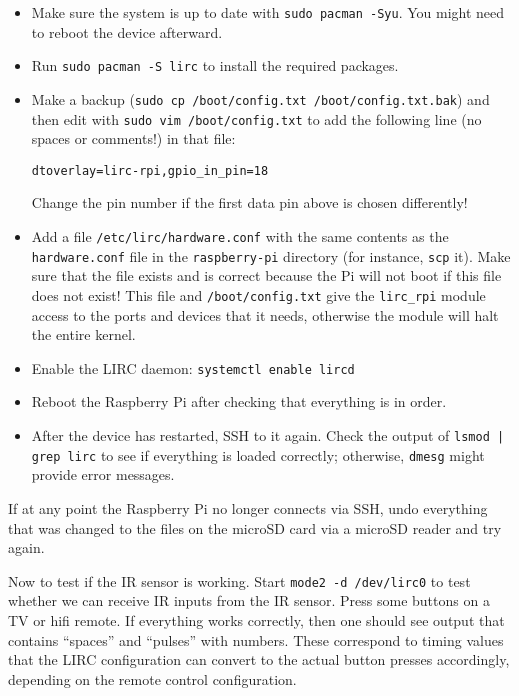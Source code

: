 \documentclass{article}
\begin{document}
\begin{itemize}
    \item Make sure the system is up to date with {\tt sudo pacman -Syu}. You
          might need to reboot the device afterward.
    \item Run {\tt sudo pacman -S lirc} to install the required packages.
    \item Make a backup ({\tt sudo cp /boot/config.txt /boot/config.txt.bak}) 
          and then edit with {\tt sudo vim /boot/config.txt} to add the 
          following line (no spaces or comments!) in that file:

          {\tt dtoverlay=lirc-rpi,gpio\_in\_pin=18}

          Change the pin number if the first data pin above is chosen 
          differently!
    \item Add a file {\tt /etc/lirc/hardware.conf} with the same contents as 
          the {\tt hardware.conf} file in the {\tt raspberry-pi} directory (for 
          instance, {\tt scp} it).  Make sure that the file exists and is 
          correct because the Pi will not boot if this file does not exist!  
          This file and {\tt /boot/config.txt} give the {\tt lirc\_rpi} module 
          access to the ports and devices that it needs, otherwise the module 
          will halt the entire kernel.
    \item Enable the LIRC daemon: {\tt systemctl enable lircd}
    \item Reboot the Raspberry Pi after checking that everything is in order.
    \item After the device has restarted, SSH to it again. Check the output of 
          {\tt lsmod | grep lirc} to see if everything is loaded correctly; 
          otherwise, {\tt dmesg} might provide error messages.
\end{itemize}

If at any point the Raspberry Pi no longer connects via SSH, undo everything 
that was changed to the files on the microSD card via a microSD reader and try 
again.

Now to test if the IR sensor is working. Start {\tt mode2 -d /dev/lirc0} to 
test whether we can receive IR inputs from the IR sensor. Press some buttons on 
a TV or hifi remote. If everything works correctly, then one should see output 
that contains ``spaces'' and ``pulses'' with numbers. These correspond to 
timing values that the LIRC configuration can convert to the actual button 
presses accordingly, depending on the remote control configuration.
\end{document}
